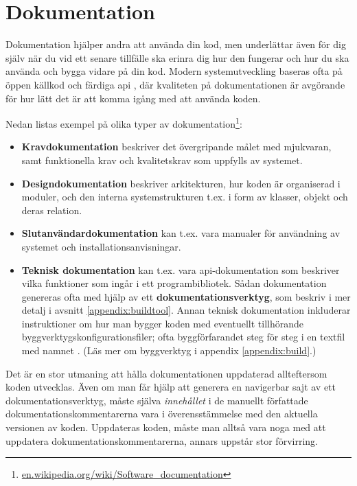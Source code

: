 
\chapter{Dokumentation}

Dokumentation hjälper andra att använda din kod, men underlättar även för dig själv när du vid ett senare tillfälle ska erinra dig hur den fungerar och hur du ska använda och bygga vidare på din kod. Modern systemutveckling baseras ofta på öppen källkod och färdiga api , där kvaliteten på dokumentationen är avgörande för hur lätt det är att komma igång med att använda koden.

Nedan listas exempel på olika typer av  dokumentation\footnote{\href{https://en.wikipedia.org/wiki/Software_documentation}{en.wikipedia.org/wiki/Software\_documentation}}:

\begin{itemize}
\item \textbf{Kravdokumentation} beskriver det övergripande målet med mjukvaran, samt funktionella krav och kvalitetskrav som uppfylls av systemet.
\item \textbf{Designdokumentation} beskriver arkitekturen, hur koden är organiserad i moduler, och den interna systemstrukturen t.ex. i form av klasser, objekt och deras relation.
\item \textbf{Slutanvändardokumentation} kan t.ex. vara manualer för användning av systemet och installationsanvisningar.
\item \textbf{Teknisk dokumentation} kan t.ex. vara api-dokumentation som beskriver vilka funktioner som ingår i ett programbibliotek. Sådan dokumentation genereras ofta med hjälp av ett \textbf{dokumentationsverktyg}, som beskriv  i mer detalj i avsnitt \ref{appendix:buildtool}.  Annan teknisk dokumentation inkluderar instruktioner om hur man bygger koden med eventuellt tillhörande byggverktygskonfigurationsfiler; ofta byggförfarandet steg för steg i en textfil med namnet . (Läs mer om byggverktyg i appendix \ref{appendix:build}.) 
\end{itemize}

\noindent Det är en stor utmaning att hålla dokumentationen uppdaterad allteftersom koden utvecklas. Även om man får hjälp att generera en navigerbar sajt av ett dokumentationsverktyg, måste själva \textit{innehållet} i de manuellt författade dokumentationskommentarerna vara i överensstämmelse med den aktuella versionen av koden. Uppdateras koden, måste man alltså vara noga med att uppdatera dokumentationskommentarerna, annars uppstår stor förvirring. 


